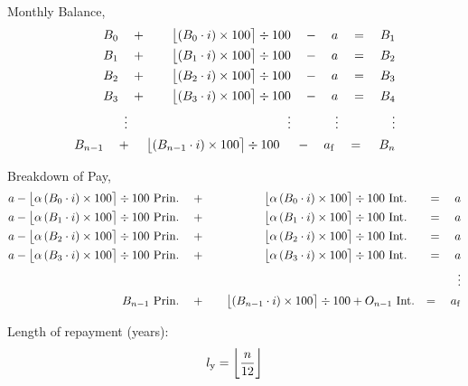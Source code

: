 \documentclass[12pt,letterpaper,oneside]{article}
\theoremstyle{remark} %
\begin{document}
	\newpage
	Monthly Balance,
	\small
	\begin{align*}
	B_{0}\quad +\qquad\big\lfloor{\left(B_{0}\cdot i\right)\times 100}\big\rceil\div 100\quad -\quad a\quad =\quad B_{1}\\
	B_{1}\quad +\qquad\big\lfloor{\left(B_{1}\cdot i\right)\times 100}\big\rceil\div 100\quad -\quad a\quad =\quad B_{2}\\
	B_{2}\quad +\qquad\big\lfloor{\left(B_{2}\cdot i\right)\times 100}\big\rceil\div 100\quad -\quad a\quad =\quad B_{3}\\
	B_{3}\quad +\qquad\big\lfloor{\left(B_{3}\cdot i\right)\times 100}\big\rceil\div 100\quad -\quad a\quad =\quad B_{4}\\
	\vdots\qquad\qquad\qquad\qquad\qquad\qquad\ \ \vdots\qquad\quad\,\ \vdots\qquad\quad\ \ \ \:\vdots\\
	B_{n-1}\quad +\quad\,\big\lfloor{\left(B_{n-1}\cdot i\right)\times 100}\big\rceil\div 100\ \ \ \;-\ \ \ a_{\rm{f}}\quad =\ \ \ \,B_{n}
	\end{align*}
	
	Breakdown of Pay,
	\begin{align*}
	a-\big\lfloor{\alpha\left(B_{0}\cdot i\right)\times 100}\big\rceil\div 100\mbox{\ Prin.}&\quad +\quad \qquad\quad\ \ \ \big\lfloor{\alpha\left(B_{0}\cdot i\right)\times 100}\big\rceil\div 100\mbox{\ Int.}&\, =\quad a&\\
	a-\big\lfloor{\alpha\left(B_{1}\cdot i\right)\times 100}\big\rceil\div 100\mbox{\ Prin.}&\quad +\quad \qquad\quad\ \ \ \big\lfloor{\alpha\left(B_{1}\cdot i\right)\times 100}\big\rceil\div 100\mbox{\ Int.}&\, =\quad a&\\
	a-\big\lfloor{\alpha\left(B_{2}\cdot i\right)\times 100}\big\rceil\div 100\mbox{\ Prin.}&\quad +\quad \qquad\quad\ \ \ \big\lfloor{\alpha\left(B_{2}\cdot i\right)\times 100}\big\rceil\div 100\mbox{\ Int.}&\, =\quad a&\\
	a-\big\lfloor{\alpha\left(B_{3}\cdot i\right)\times 100}\big\rceil\div 100\mbox{\ Prin.}&\quad +\quad \qquad\quad\ \ \ \big\lfloor{\alpha\left(B_{3}\cdot i\right)\times 100}\big\rceil\div 100\mbox{\ Int.}&\, =\quad a&\\
	&&\vdots&\\
	B_{n-1}\mbox{\ Prin.}&\quad +\quad\ \:\:\big\lfloor{\left(B_{n-1}\cdot i\right)\times 100}\big\rceil\div 100+O_{n-1}\mbox{\ Int.}& =\,\ \ \,a_{\rm{f}}&
	\end{align*}
	\normalsize

	\setlength\parindent{0pt} Length of repayment (years):
	$$l_{\rm{y}}=\bigg\lfloor{\frac{n}{12}}\bigg\rfloor$$
\end{document}
